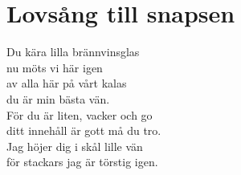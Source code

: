 \section{Lovsång till snapsen}
Du kära lilla brännvinsglas\\
nu möts vi här igen\\
av alla här på vårt kalas\\
du är min bästa vän.\\
För du är liten, vacker och go\\
ditt innehåll är gott må du tro.\\
Jag höjer dig i skål lille vän\\
för stackars jag är törstig igen.\\